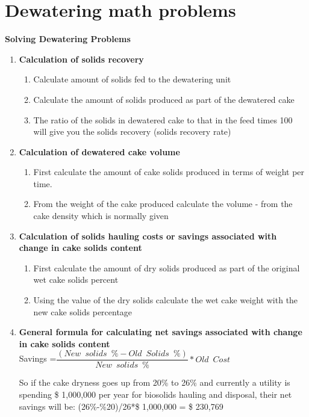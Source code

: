 \section{Dewatering math problems}


\textbf{Solving Dewatering Problems}
\begin{enumerate}
	\item \textbf{Calculation of solids recovery}\\
		\begin{enumerate}
		\item Calculate amount of solids fed to the dewatering unit
		\item Calculate the amount of solids produced as part of the dewatered cake
		\item The ratio of the solids in dewatered cake to that in the feed times 100 will give you the solids recovery (solids recovery rate)
		\end{enumerate}
	\item \textbf{Calculation of dewatered cake volume}\\
		\begin{enumerate}
		\item First calculate the amount of cake solids produced in terms of weight per time.
		\item From the weight of the cake produced calculate the volume - from the cake density which is normally given\\
		\end{enumerate}
	\item \textbf{Calculation of solids hauling costs or savings associated with change in cake solids content}\\
		\begin{enumerate}
		\item First calculate the amount of dry solids produced as part of the original wet cake solids percent
		\item Using the value of the dry solids calculate the wet cake weight with the new cake solids percentage\\
		\end{enumerate}
	\item \textbf{General formula for calculating net savings associated with change in cake solids content}\\
Savings =$ \dfrac {(New \enspace solids \enspace \%-Old \enspace Solids \enspace \%)}{New \enspace solids \enspace \%}*Old \enspace Cost$

So if the cake dryness goes up from 20\% to 26\% and currently a utility is spending \$ 1,000,000 per year for biosolids hauling and disposal, their net savings will be: (26\%-\%20)/26*\$ 1,000,000 = \$ 230,769
\end{enumerate}

